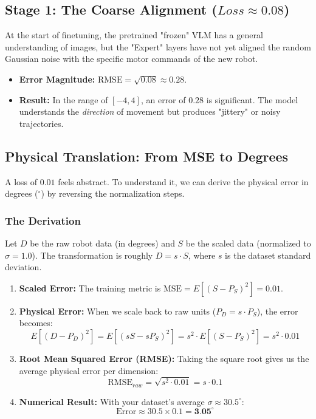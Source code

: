 \documentclass[11pt,a4paper]{article}
\begin{document}
\subsection{Stage 1: The Coarse Alignment ($Loss \approx 0.08$)}
At the start of finetuning, the pretrained "frozen" VLM has a general understanding of images, but the "Expert" layers have not yet aligned the random Gaussian noise with the specific motor commands of the new robot.
\begin{itemize}
    \item \textbf{Error Magnitude:} $\text{RMSE} = \sqrt{0.08} \approx 0.28$.
    \item \textbf{Result:} In the range of $[-4, 4]$, an error of $0.28$ is significant. The model understands the \textit{direction} of movement but produces "jittery" or noisy trajectories.
\end{itemize}

\subsection{Physical Translation: From MSE to Degrees}
A loss of $0.01$ feels abstract. To understand it, we can derive the physical error in degrees ($^\circ$) by reversing the normalization steps.

\subsubsection*{The Derivation}
Let $D$ be the raw robot data (in degrees) and $S$ be the scaled data (normalized to $\sigma = 1.0$). The transformation is roughly $D = s \cdot S$, where $s$ is the dataset standard deviation.
\begin{enumerate}
    \item \textbf{Scaled Error:} The training metric is $\text{MSE} = E[(S - P_S)^2] = 0.01$.
    \item \textbf{Physical Error:} When we scale back to raw units ($P_D = s \cdot P_S$), the error becomes:
    \[ E[(D - P_D)^2] = E[(sS - sP_S)^2] = s^2 \cdot E[(S - P_S)^2] = s^2 \cdot 0.01 \]
    \item \textbf{Root Mean Squared Error (RMSE):} Taking the square root gives us the average physical error per dimension:
    \[ \text{RMSE}_{raw} = \sqrt{s^2 \cdot 0.01} = s \cdot 0.1 \]
    \item \textbf{Numerical Result:} With your dataset's average $\sigma \approx 30.5^\circ$:
    \[ \text{Error} \approx 30.5 \times 0.1 = \textbf{3.05}^\circ \]
\end{enumerate}
\end{document}
